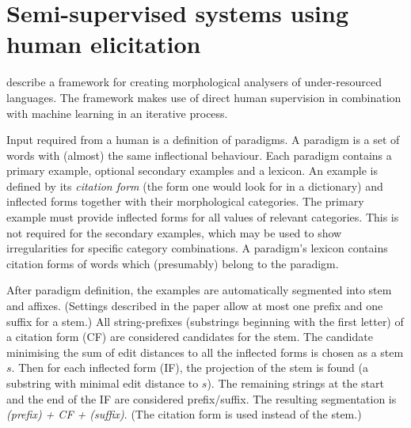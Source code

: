\section{Semi-supervised systems using human elicitation}
\cite{oflazer01} describe a framework for creating morphological analysers of under-resourced languages. The framework makes use of direct human supervision in combination with machine learning in an iterative process. 

Input required from a human is a definition of paradigms. A paradigm is a set of words with (almost) the same inflectional behaviour. Each paradigm contains a primary example, optional secondary examples and a lexicon. An example is defined by its \emph{citation form} (the form one would look for in a dictionary) and inflected forms together with their morphological categories. The primary example must provide inflected forms for all values of relevant categories. This is not required for the secondary examples, which may be used to show irregularities for specific category combinations. A paradigm's lexicon contains citation forms of words which (presumably) belong to the paradigm.

After paradigm definition, the examples are automatically segmented in\-to stem and affixes. (Settings described in the paper allow at most one prefix and one suffix for a stem.) All string-prefixes (substrings beginning with the first letter) of a citation form (CF) are considered candidates for the stem. The candidate minimising the sum of  edit distances to all the inflected forms is chosen as a stem $s$. Then for each inflected form (IF), the projection of the stem is found (a substring with minimal edit distance to $s$). The remaining strings at the start and the end of the IF are considered prefix/suffix. The resulting segmentation is \emph{(prefix) + CF + (suffix)}. (The citation form is used instead of the stem.)

